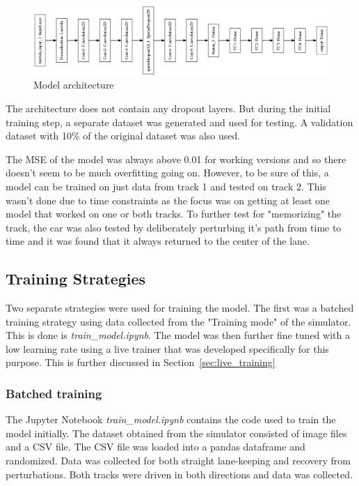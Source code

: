 \documentclass[paper=letter, fontsize=11pt]{scrartcl}
\numberwithin{equation}{section}		%
\numberwithin{figure}{section}			%
\numberwithin{table}{section}				%
\begin{document}
\begin{figure}[!htbp]
  \includegraphics[width=\linewidth]{model.png}
  \caption{Model architecture}
  \label{fig:model_arch}
\end{figure}

The architecture does not contain any dropout layers. But during the initial training step, a separate dataset was generated and used for testing. A validation dataset with 10\% of the original dataset was also used.

The MSE of the model was always above 0.01 for working versions and so there doesn't seem to be much overfitting going on. However, to be sure of this, a model can be trained on just data from track 1 and tested on track 2. This wasn't done due to time constraints as the focus was on getting at least one model that worked on one or both tracks. To further test for "memorizing" the track, the car was also tested by deliberately perturbing it's path from time to time and it was found that it always returned to the center of the lane.

\subsection{Training Strategies}

Two separate strategies were used for training the model. The first was a batched training strategy using data collected from the "Training mode" of the simulator. This is done is \emph{train\_model.ipynb}. The model was then further fine tuned with a low learning rate using a live trainer that was developed specifically for this purpose. This is further discussed in Section~\ref{sec:live_training}

\subsubsection{Batched training}
\label{sec:batched_training}

The Jupyter Notebook \emph{train\_model.ipynb} contains the code used to train the model initially. The dataset obtained from the simulator consisted of image files and a CSV file. The CSV file was loaded into a pandas dataframe and randomized. Data was collected for both straight lane-keeping and recovery from perturbations. Both tracks were driven in both directions and data was collected. 
\end{document}
